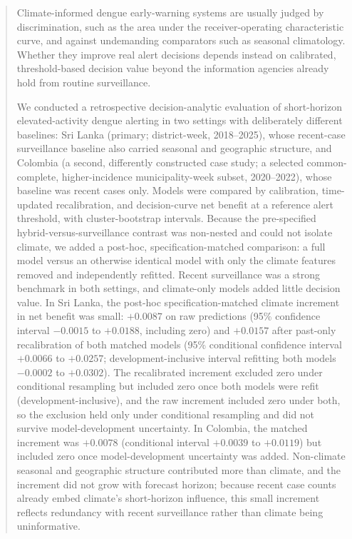 \documentclass[11pt,a4paper]{article}
\begin{document}
\begin{abstract}
\noindent Climate-informed dengue early-warning systems are usually judged by discrimination, such as the area under the receiver-operating characteristic curve, and against undemanding comparators such as seasonal climatology. Whether they improve real alert decisions depends instead on calibrated, threshold-based decision value beyond the information agencies already hold from routine surveillance.

\noindent We conducted a retrospective decision-analytic evaluation of short-horizon elevated-activity dengue alerting in two settings with deliberately different baselines: Sri Lanka (primary; district-week, 2018--2025), whose recent-case surveillance baseline also carried seasonal and geographic structure, and Colombia (a second, differently constructed case study; a selected common-complete, higher-incidence municipality-week subset, 2020--2022), whose baseline was recent cases only. Models were compared by calibration, time-updated recalibration, and decision-curve net benefit at a reference alert threshold, with cluster-bootstrap intervals. Because the pre-specified hybrid-versus-surveillance contrast was non-nested and could not isolate climate, we added a post-hoc, specification-matched comparison: a full model versus an otherwise identical model with only the climate features removed and independently refitted. Recent surveillance was a strong benchmark in both settings, and climate-only models added little decision value. In Sri Lanka, the post-hoc specification-matched climate increment in net benefit was small: $+0.0087$ on raw predictions (95\% confidence interval $-0.0015$ to $+0.0188$, including zero) and $+0.0157$ after past-only recalibration of both matched models (95\% conditional confidence interval $+0.0066$ to $+0.0257$; development-inclusive interval refitting both models $-0.0002$ to $+0.0302$). The recalibrated increment excluded zero under conditional resampling but included zero once both models were refit (development-inclusive), and the raw increment included zero under both, so the exclusion held only under conditional resampling and did not survive model-development uncertainty. In Colombia, the matched increment was $+0.0078$ (conditional interval $+0.0039$ to $+0.0119$) but included zero once model-development uncertainty was added. Non-climate seasonal and geographic structure contributed more than climate, and the increment did not grow with forecast horizon; because recent case counts already embed climate's short-horizon influence, this small increment reflects redundancy with recent surveillance rather than climate being uninformative.


\end{abstract}
\end{document}

